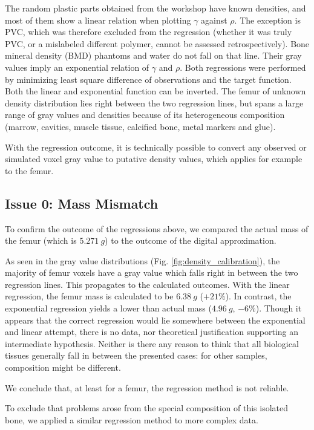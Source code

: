 The random plastic parts obtained from the workshop have known densities, and most of them show a linear relation when plotting \(\gamma\) against \(\rho\).
The exception is PVC, which was therefore excluded from the regression (whether it was truly PVC, or a mislabeled different polymer, cannot be assessed retrospectively).
Bone mineral density (BMD) phantoms and water do not fall on that line.
Their gray values imply an exponential relation of \(\gamma\) and \(\rho\).
Both regressions were performed by minimizing least square difference of observations and the target function.
Both the linear and exponential function can be inverted.
The femur of unknown density distribution lies right between the two regression lines, but spans a large range of gray values and densities because of its heterogeneous composition (marrow, cavities, muscle tissue, calcified bone, metal markers and glue).

With the regression outcome, it is technically possible to convert any observed or simulated voxel gray value to putative density values, which applies for example to the femur.


\subsection{Issue 0: Mass Mismatch}
\label{sec:org486bf87}

To confirm the outcome of the regressions above, we compared the actual mass of the femur (which is \(5.271\ g\)) to the outcome of the digital approximation.

As seen in the gray value distributions (Fig. \ref{fig:density_calibration}), the majority of femur voxels have a gray value which falls right in between the two regression lines.
This propagates to the calculated outcomes.
With the linear regression, the femur mass is calculated to be \(6.38\ g\) (\(+21 \%\)).
In contrast, the exponential regression yields a lower than actual mass (\(4.96\ g\), \(-6 \%\)).
Though it appears that the correct regression would lie somewhere between the exponential and linear attempt, there is no data, nor theoretical justification supporting an intermediate hypothesis.
Neither is there any reason to think that all biological tissues generally fall in between the presented cases: for other samples, composition might be different.

We conclude that, at least for a femur, the regression method is not reliable.

\bigskip
To exclude that problems arose from the special composition of this isolated bone, we applied a similar regression method to more complex data.

